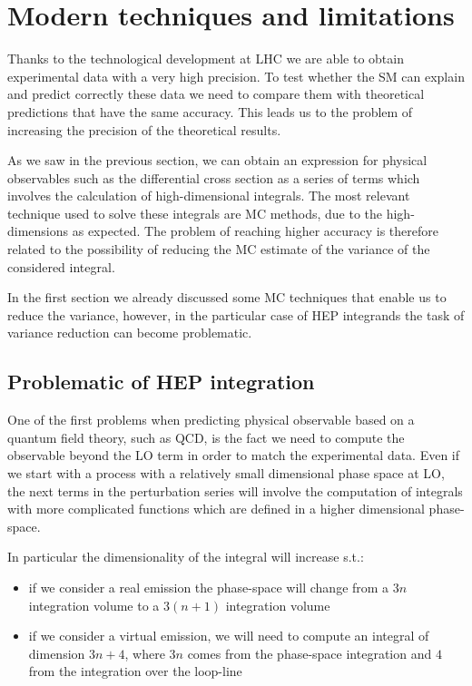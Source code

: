 \documentclass[../main/main.tex]{subfiles}
\begin{document}
\section{Modern techniques and limitations}
Thanks to the technological development at LHC we are able to obtain experimental data with a very high precision. To test whether 
the SM can explain and predict correctly these data we need to compare them with  theoretical predictions that have the same accuracy.
This leads us to the problem of increasing the precision of the theoretical results. 

As we saw in the previous section, we can obtain an expression for physical observables such as the differential cross section as a series of terms which involves the calculation of high-dimensional integrals. The most relevant technique used to solve these integrals are MC methods, due to the high-dimensions as expected. The problem of reaching higher accuracy is therefore related 
to the possibility of reducing the MC estimate of the variance of the considered integral.

In the first section we already discussed some MC techniques that enable us to reduce the variance, however, in the particular case of HEP integrands the task of variance reduction can become problematic.

\subsection{Problematic of HEP integration}
One of the first problems when predicting physical observable based on a quantum field theory, such as QCD, is the fact we need to compute the observable beyond the LO term in order to match the experimental data.
Even if we start with a process with a relatively small dimensional phase space  at LO, the next terms in the perturbation series will involve the computation of integrals with more complicated functions which are defined in a higher dimensional phase-space.

In particular the dimensionality of the integral will increase s.t.:
\begin{itemize}
	\item if we consider a real emission  the phase-space will change from a $3 n$ integration volume to a $3(n+1)$ integration volume
	\item if we consider a virtual emission, we will need to compute an integral of dimension $3n +4$, where $3n$ comes from the phase-space integration and $4$ from the integration over the loop-line
\end{itemize}
\end{document}
